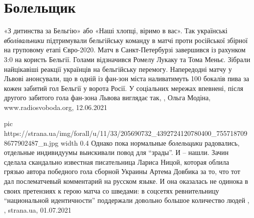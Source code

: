  
 
 
 
 
\chapter{Болельщик}
\label{sec:slova.bolelschik}

«З дитинства за Бельгію» або «Наші хлопці, віримо в вас». Так українські
\emph{вболівальники} підтримували бельгійську команду в матчі проти російської
збірної на груповому етапі Євро-2020. Матч в Санкт-Петербурзі завершився із
рахунком 3:0 на користь Бельгії. Голами відзначився Ромелу Лукаку та Тома
Меньє. Зібрали найцікавіші реакції українців на бельгійську перемогу.
Напередодні матчу у Львові анонсували, що в одній із фан-зон міста наливатимуть
100 бокалів пива за кожен забитий гол Бельгії у ворота Росії. У соціальних
мережах впевнені, після другого забитого гола фан-зона Львова виглядає так,
, Ольга Модіна, www.radiosvoboda.org, 12.06.2021

\ifcmt
  pic https://strana.ua/img/forall/u/11/33/205690732_4392724120780400_7557187098677902487_n.jpg
	width 0.4
\fi
Однако пока нормальные \emph{болельщики} радовались, отдельные индивидуумы выискивали
повод для \enquote{зрады}. И – нашли.  Зачин сделала скандально известная писательница
Лариса Ницой, которая облила грязью автора победного гола сборной Украины
Артема Довбика за то, что тот дал послематчевый комментарий на русском языке. И
она оказалась не одинока в своих претензиях к герою матча со шведами: в
соцсетях ревнительницу \enquote{национальной идентичности} поддержали довольно большое
количество людей
, 
, strana.ua, 01.07.2021
